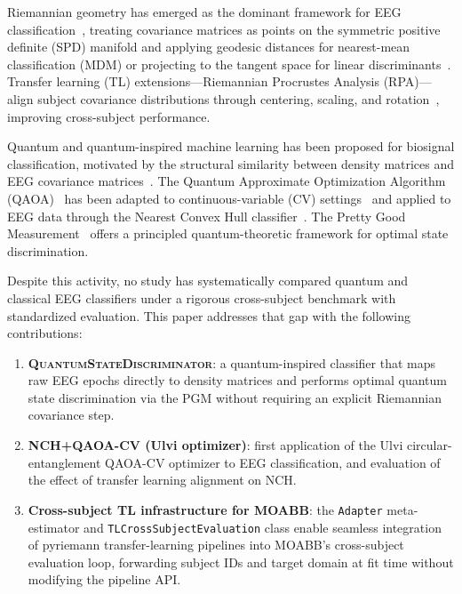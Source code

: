 \documentclass{article}
\begin{document}
Riemannian geometry has emerged as the dominant framework for EEG
classification~\cite{barachant2012multiclass}, treating covariance matrices as
points on the symmetric positive definite (SPD) manifold and applying
geodesic distances for nearest-mean classification (MDM) or projecting to the
tangent space for linear discriminants~\cite{yger2017riemannian}.
Transfer learning (TL) extensions---Riemannian Procrustes Analysis (RPA)---align
subject covariance distributions through centering, scaling, and
rotation~\cite{rodrigues2019riemannian}, improving cross-subject performance.

Quantum and quantum-inspired machine learning has been proposed for
biosignal classification, motivated by the structural similarity between
density matrices and EEG covariance matrices~\cite{schuld2019quantum}.
The Quantum Approximate Optimization Algorithm
(QAOA)~\cite{farhi2014quantum} has been adapted to continuous-variable
(CV) settings~\cite{lloyd2018quantum} and applied to EEG data through the
Nearest Convex Hull classifier~\cite{quanticNCH2023}.  The Pretty Good
Measurement~\cite{hausladen1994pretty} offers a principled quantum-theoretic
framework for optimal state discrimination.

Despite this activity, no study has systematically compared quantum and
classical EEG classifiers under a rigorous cross-subject benchmark with
standardized evaluation.  This paper addresses that gap with the following
contributions:
\begin{enumerate}
  \item \textbf{\textsc{QuantumStateDiscriminator}}: a quantum-inspired
    classifier that maps raw EEG epochs directly to density matrices and
    performs optimal quantum state discrimination via the PGM without
    requiring an explicit Riemannian covariance step.
  \item \textbf{NCH+QAOA-CV (Ulvi optimizer)}: first application of the Ulvi
    circular-entanglement QAOA-CV optimizer to EEG classification, and
    evaluation of the effect of transfer learning alignment on NCH.
  \item \textbf{Cross-subject TL infrastructure for MOABB}: the
    \texttt{Adapter} meta-estimator and \texttt{TLCrossSubjectEvaluation}
    class enable seamless integration of pyriemann transfer-learning
    pipelines into MOABB's cross-subject evaluation loop, forwarding subject
    IDs and target domain at fit time without modifying the pipeline API.
\end{enumerate}
\end{document}
